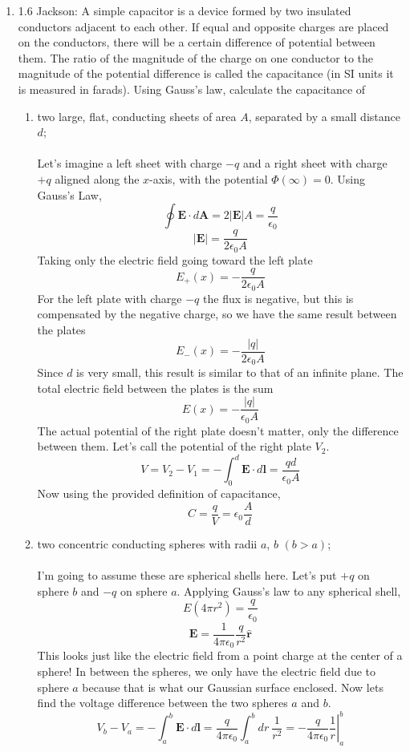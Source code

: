 \documentclass[11pt,letterpaper]{article}
\newcommand{\vect}[1]{\mathbf{#1}}
\begin{document}
\begin{enumerate}
\item 1.6 Jackson: A simple capacitor is a device formed by two insulated conductors adjacent to each other. If equal and opposite charges are placed on the conductors, there will be a certain difference of potential between them. The ratio of the magnitude of the charge on one conductor to the magnitude of the potential difference is called the capacitance (in SI units it is measured in farads). Using Gauss's law, calculate the capacitance of
\begin{enumerate}
\item two large, flat, conducting sheets of area $A$, separated by a small distance $d$;
\\ \\Let's imagine a left sheet with charge $-q$ and a right sheet with charge $+q$ aligned along the $x$-axis, with the potential $\Phi(\infty) = 0$. Using Gauss's Law,
$$\oint{\vect E\cdot d\vect A} = 2|\vect E|A=\frac{q}{\epsilon_0}$$
$$|\vect E| = \frac{q}{2\epsilon_0A}$$ 
Taking only the electric field going toward the left plate
$$E_+(x) = -\frac{q}{2\epsilon_0A}$$
For the left plate with charge $-q$ the flux is negative, but this is compensated by the negative charge, so we have the same result between the plates
$$E_-(x) = -\frac{|q|}{2\epsilon_0A}$$
Since $d$ is very small, this result is similar to that of an infinite plane. The total electric field between the plates is the sum
$$E(x) = -\frac{|q|}{\epsilon_0A}$$
The actual potential of the right plate doesn't matter, only the difference between them. Let's call the potential of the right plate $V_2$. 
$$V=V_2-V_1=-\int_{0}^{d}{\vect E\cdot d\vect l} = \frac{qd}{\epsilon_0 A}$$ 
Now using the provided definition of capacitance,
$$C = \frac{q}{V} = \epsilon_0\frac{A}{d}$$
\item two concentric conducting spheres with radii $a$, $b$ $(b>a)$;
\\ \\I'm going to assume these are spherical shells here. Let's put $+q$ on sphere $b$ and $-q$ on sphere $a$. Applying Gauss's law to any spherical shell,
$$E(4\pi r^2)= \frac{q}{\epsilon_0}$$
$$\vect E = \frac{1}{4\pi\epsilon_0}\frac{q}{r^2}\hat{\vect r}$$
This looks just like the electric field from a point charge at the center of a sphere! In between the spheres, we only have the electric field due to sphere $a$ because that is what our Gaussian surface enclosed. Now lets find the voltage difference between the two spheres $a$ and $b$.
$$V_b-V_a = -\int_{a}^{b}{\vect E\cdot d\vect l} = \frac{q}{4\pi\epsilon_0}\int_{a}^{b}{dr\ \frac{1}{r^{2}}}=-\left.\frac{q}{4\pi\epsilon_0}\frac{1}{r}\right|_a^b$$

\end{enumerate}
\end{enumerate}
\end{document}

